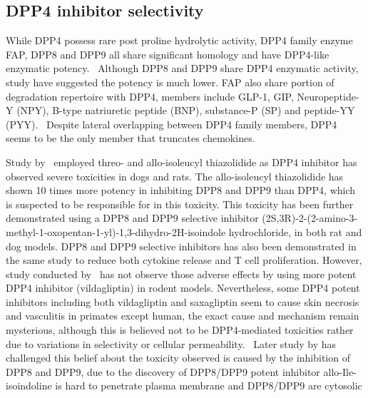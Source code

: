 \subsection{DPP4 inhibitor selectivity}
While DPP4 possess rare post proline hydrolytic activity, DPP4 family enzyme FAP, DPP8 and DPP9 all share significant homology and have DPP4-like enzymatic potency.~\cite{Kirby_2010,Thornberry_2007} Although DPP8 and DPP9 share DPP4 enzymatic activity, study have suggested the potency is much lower. FAP also share portion of degradation repertoire with DPP4, members include GLP-1, GIP, Neuropeptide-Y (NPY), B-type natriuretic peptide (BNP), substance-P (SP) and peptide-YY (PYY).~\cite{Keane_2011} Despite lateral overlapping between DPP4 family members, DPP4 seems to be the only member that truncates chemokines.~\cite{Keane_2011}  
\par 
Study by~\citet{Lankas2005} employed threo- and allo-isoleucyl thiazolidide as DPP4 inhibitor has observed severe toxicities in dogs and rats. The allo-isoleucyl thiazolidide has shown 10 times more potency in inhibiting DPP8 and DPP9 than DPP4, which is suspected to be responsible for in this toxicity. This toxicity has been further demonstrated using a DPP8 and DPP9 selective inhibitor (2S,3R)-2-(2-amino-3-methyl-1-oxopentan-1-yl)-1,3-dihydro-2H-isoindole hydrochloride, in both rat and dog models. DPP8 and DPP9 selective inhibitors has also been demonstrated in the same study to reduce both cytokine release and T cell proliferation. However, study conducted by~\citet{Burkey2008} has not observe those adverse effects by using more potent DPP4 inhibitor (vildagliptin) in rodent models. Nevertheless, some DPP4 potent inhibitors including both vildagliptin and saxagliptin seem to cause skin necrosis and vasculitis in primates except human, the exact cause and mechanism remain mysterious, although this is believed not to be DPP4-mediated toxicities rather due to variations in selectivity or cellular permeability.~\cite{Hoffmann2014} Later study by \citet{Bank2011} has challenged this belief about the toxicity observed is caused by the inhibition of DPP8 and DPP9, due to the discovery of DPP8/DPP9 potent inhibitor allo-Ile-isoindoline is hard to penetrate plasma membrane and DPP8/DPP9 are cytosolic  
\par 